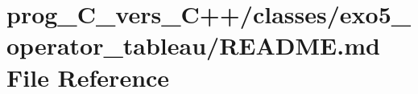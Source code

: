\hypertarget{prog__C__vers__C_09_09_2classes_2exo5__operator__tableau_2README_8md}{}\section{prog\+\_\+\+C\+\_\+vers\+\_\+\+C++/classes/exo5\+\_\+operator\+\_\+tableau/\+R\+E\+A\+D\+ME.md File Reference}
\label{prog__C__vers__C_09_09_2classes_2exo5__operator__tableau_2README_8md}
